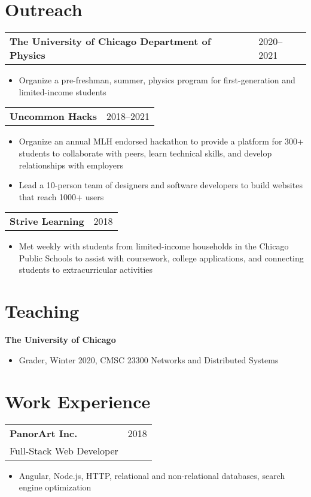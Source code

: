 \documentclass[letterpaper, 11pt]{article}
\begin{document}
\section{Outreach}
\begin{tabular}{@{} L{12cm} @{} R{4.51cm} @{}}
  \textbf{The University of Chicago Department of Physics} & 2020--2021\\
\end{tabular}
\begin{itemize}
\item Organize a pre-freshman, summer, physics program for first-generation and limited-income
  students
\end{itemize}

\begin{tabular}{@{} L{12cm} @{} R{4.51cm} @{}}
  \textbf{Uncommon Hacks} & 2018--2021\\
\end{tabular}
\begin{itemize}
\item Organize an annual MLH endorsed hackathon to provide a platform for 300+
  students to collaborate with peers, learn technical skills,
  and develop relationships with employers
\item Lead a 10-person team of designers and software developers
  to build websites that reach 1000+ users
\end{itemize}

\begin{tabular}{@{} L{12cm} @{} R{4.51cm} @{}}
  \textbf{Strive Learning} & 2018\\
\end{tabular}
\begin{itemize}
\item Met weekly with students from limited-income households in the Chicago Public Schools
  to assist with coursework, college applications, and connecting
  students to extracurricular activities
\end{itemize}

\section{Teaching}
\textbf{The University of Chicago}
\begin{itemize}
  \item Grader, Winter 2020, CMSC 23300 Networks and Distributed Systems
\end{itemize}

\section{Work Experience}
\begin{tabular}{@{} L{12cm} @{} R{4.51cm} @{}}
  \textbf{PanorArt Inc.} & 2018 \\
  Full-Stack Web Developer\\
\end{tabular}
\begin{itemize}
\item Angular, Node.js, HTTP, relational and non-relational databases, search engine optimization
\end{itemize}
\end{document}
